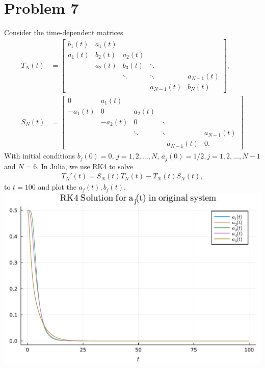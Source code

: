 \documentclass{article}
\begin{document}
\section{Problem 7}
Consider the time-dependent matrices
\begin{align*}
	T_N(t) &= \begin{bmatrix}
		b_1(t) & a_1(t)\\
		a_1(t) & b_{2}(t) & a_{2}(t)\\
		& a_{2}(t) & b_{3}(t) & \ddots\\
		&& \ddots & \ddots & a_{N-1}(t) \\
		&&& a_{N-1}(t) & b_N(t)
	\end{bmatrix},\\
	S_N(t) &= \begin{bmatrix}
		0 & a_1(t)\\
		-a_1(t) & 0 & a_{2}(t)\\
		& -a_{2}(t) & 0 & \ddots\\
		&& \ddots & \ddots & a_{N-1}(t) \\
		&&& -a_{N-1}(t) & 0.
	\end{bmatrix}
\end{align*}
With initial conditions $b_j(0) = 0$, $j = 1,2,\ldots,N$, $a_j(0) = 1/2, j = 1,2,\ldots,N-1$ and $N = 6$. In Julia, we use RK4 to solve 
\begin{align*}
	T_N'(t) = S_N(t) T_N(t) - T_N(t)S_N(t),
\end{align*}
to $t = 100$ and plot the $a_j(t),b_j(t)$. \\
\includegraphics[scale=0.5]{p7ii.pdf}\\
\\
\end{document}
